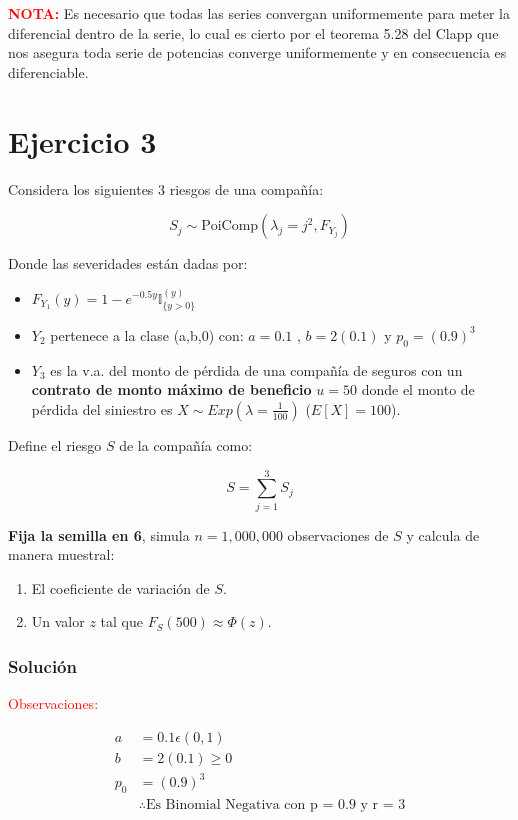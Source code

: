\documentclass[
]{article}
\providecommand{\tightlist}{%
  \setlength{\itemsep}{0pt}\setlength{\parskip}{0pt}}
\begin{document}
\textbf{\textcolor{red}{NOTA:}} Es necesario que todas las series
convergan uniformemente para meter la diferencial dentro de la serie, lo
cual es cierto por el teorema 5.28 del Clapp que nos asegura toda serie
de potencias converge uniformemente y en consecuencia es diferenciable.

\hypertarget{ejercicio-3}{%
\section{Ejercicio 3}\label{ejercicio-3}}

Considera los siguientes 3 riesgos de una compañía:

\[S_j\sim\text{PoiComp}\left(\lambda_j=j^2,F_{Y_j}\right)\]

Donde las severidades están dadas por:

\begin{itemize}
\tightlist
\item
  \(F_{Y_1}(y)=1-e^{-0.5y} \mathbb{I}^{(y)}_{\{y>0\}}\)
\item
  \(Y_2\) pertenece a la clase (a,b,0) con: \(a=0.1\) , \(b=2(0.1)\) y
  \(p_0=(0.9)^{3}\)
\item
  \(Y_3\) es la v.a. del monto de pérdida de una compañía de seguros con
  un \textbf{contrato de monto máximo de beneficio} \(u=50\) donde el
  monto de pérdida del siniestro es
  \(X\sim Exp\left(\lambda=\frac{1}{100}\right)\) (\(E[X]=100\)).
\end{itemize}

Define el riesgo \(S\) de la compañía como:

\[S=\sum_{j=1}^{3} S_j\]

\textbf{Fija la semilla en 6}, simula \(n=1,000,000\) observaciones de
\(S\) y calcula de manera muestral:

\begin{enumerate}[label=(\alph*)]
\item  El coeficiente de variación de $S$.
\item  Un valor $z$ tal que $F_S(500)\approx \Phi(z)$.
\end{enumerate}

\hypertarget{soluciuxf3n-2}{%
\subsubsection{Solución}\label{soluciuxf3n-2}}

\textcolor{red}{Observaciones:}

\begin{align*}
a &= 0.1 \epsilon (0,1)\\
b &= 2(0.1) \geq 0\\
p_{0} &= (0.9)^{3}\\
&\therefore \text{Es Binomial Negativa con p = 0.9 y r = 3}
\end{align*}
\end{document}
